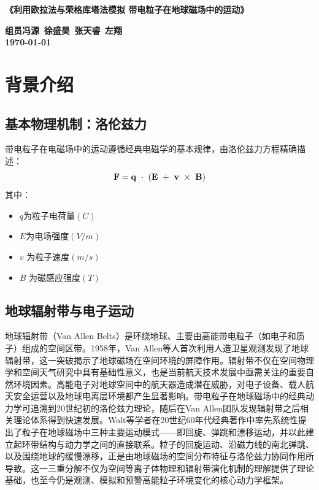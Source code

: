 \documentclass[11pt]{article}
\begin{document}

\begin{center}
    \LARGE \bf 《利用欧拉法与荣格库塔法模拟
带电粒子在地球磁场中的运动》
\end{center}




\begin{center}
    \Large \bf 组员\qquad 冯源\, 徐盛昊\, 张天睿\, 左翔\\
    \Large \bf {\today}
\end{center}
\section{背景介绍}


    \subsection{基本物理机制：洛伦兹力}
    带电粒子在电磁场中的运动遵循经典电磁学的基本规律，由洛伦兹力方程精确描述：
    \begin{equation}
        \bf{F}=q\ \cdot\ (E\ + \ \bf{v}\ \times \ \bf{B})\label{1}
    \end{equation}
    其中：
    \begin{itemize}
        \item $q$为粒子电荷量$(C)$
        \item $E$为电场强度$(V/m)$
        \item $v$ 为粒子速度$(m/s)$
        \item $B$ 为磁感应强度$(T)$
    \end{itemize}
    \subsection{地球辐射带与电子运动} 
    地球辐射带（Van Allen Belts）是环绕地球、主要由高能带电粒子（如电子和质子）组成的空间区带。1958年，Van Allen等人首次利用人造卫星观测发现了地球辐射带，这一突破揭示了地球磁场在空间环境的屏障作用。辐射带不仅在空间物理学和空间天气研究中具有基础性意义，也是当前航天技术发展中亟需关注的重要自然环境因素。高能电子对地球空间中的航天器造成潜在威胁，对电子设备、载人航天安全运营以及地球电离层环境都产生显著影响。带电粒子在地球磁场中的经典动力学可追溯到20世纪初的洛伦兹力理论，随后在Van Allen团队发现辐射带之后相关理论体系得到快速发展。Walt等学者在20世纪60年代经典著作中率先系统性提出了粒子在地球磁场中三种主要运动模式——即回旋、弹跳和漂移运动，并以此建立起环带结构与动力学之间的直接联系。粒子的回旋运动、沿磁力线的南北弹跳、以及围绕地球的缓慢漂移，正是由地球磁场的空间分布特征与洛伦兹力协同作用所导致。这一三重分解不仅为空间等离子体物理和辐射带演化机制的理解提供了理论基础，也至今仍是观测、模拟和预警高能粒子环境变化的核心动力学框架。
\end{document}
